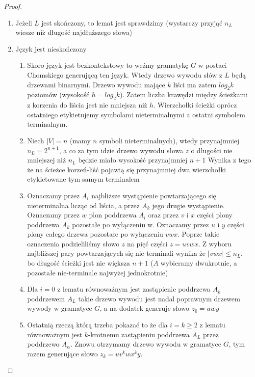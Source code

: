 \begin{lemat}
		\begin{proof}~\\
			\begin{enumerate}
				\item Jeżeli $L$ jest skończony, to lemat jest sprawdzimy (wystarczy przyjąć $n_L$ wiesze niż długość najdłuższego słowa)
				\item Język jest nieskończony
					\begin{enumerate}
						\item Skoro język jest bezkontekstowy to weźmy gramatykę $G$ w postaci Chomskiego generującą ten język. Wtedy 
						drzewo wywodu słów z $L$ będą drzewami binarnymi. Drzewo wywodu mające $k$ liści ma zatem $log_2k$ poziomów
						(wysokość $h = log_2k$). Zatem liczba krawędzi między ścieżkami z korzenia do liścia jest nie mniejsza niż $h$.
						Wierzchołki ścieżki oprócz ostatniego etykietujemy symbolami nieterminalnymi a ostatni symbolem terminalnym.
						\item Niech $|V| = n$ (mamy $n$ symboli nieterminalnych), wtedy przynajmniej $n_L = 2^{n+1}$, a co za tym 
						idzie drzewo wywodu słowa $z$ o długości nie mniejszej niż $n_L$ będzie miało wysokość przynajmniej $n+1$
						Wynika z tego że na ścieżce korzeń-liść pojawią się przynajmniej dwa wierzchołki etykietowane tym samym terminalem
						\item Oznaczamy przez $A_i$ najbliższe wystąpienie powtarzającego się nieterminalna licząc od liścia, a przez $A_k$
						jego drugie wystąpienie. Oznaczamy przez $w$ plon poddrzewa $A_l$ oraz przez $v$ i $x$ części plony poddrzewa $A_k$
						pozostałe po wyłączeniu w. Oznaczamy przez $u$ i $y$ części plony całego drzewa pozostałe po wyłączeniu $vwx$. 
						Poprze takie oznaczenia podzieliliśmy słowo $z$ na pięć części $z = uvwx$. Z wyboru najbliższej pary
						powtarzających się nie-terminali wynika że $|vwx| \leqslant n_L$, bo długość ścieżki jest nie większa $n+1$
						($A$ wybieramy dwukrotnie, a pozostałe nie-terminale najwyżej jednokrotnie)
						\item Dla $i=0$ z lematu równoważnym jest zastąpienie poddrzewa $A_k$ poddrzewem $A_L$ takie drzewo wywodu jest 
						nadal poprawnym drzewem wywody w gramatyce $G$, a na dodatek generuje słowo $z_0 = uwy$
						\item Ostatnią rzeczą którą trzeba pokazać to że dla $i = k \geqslant 2$  z lematu równoważnym jest $k$-krotnemu
						zastąpieniu poddrzewa $A_L$ przez poddrzewo $A_\alpha$. Znowu otrzymamy drzewo wywodu w gramatyce $G$, tym
						razem generujące słowo $z_k = uv^kwx^ky$.
					\end{enumerate}					 
			\end{enumerate}
		\end{proof}				
	\end{lemat}
			
